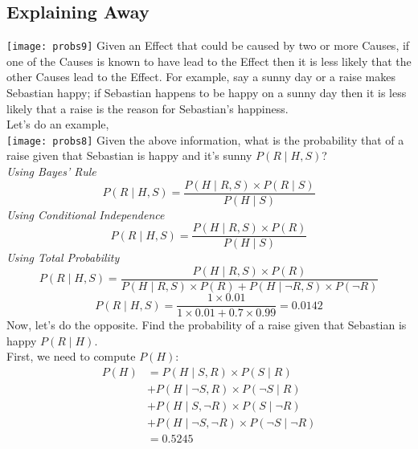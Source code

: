 \documentclass[12pt]{article}
\begin{document}
\subsection*{Explaining Away}
\vspace{2em}
\texttt{[image: probs9]}
Given an Effect that could be caused by two or more Causes, if one of the Causes is known to have lead to the Effect then it is less likely that the other Causes lead to the Effect. For example, say a \colorbox{myBlue}{sunny day} or a \colorbox{myBlue}{raise} makes Sebastian \colorbox{myRed}{happy}; if Sebastian happens to be \colorbox{myRed}{happy} on a  \colorbox{myBlue}{sunny day} then it is less likely that a \colorbox{myBlue}{raise} is the reason for Sebastian's happiness.\\
\vspace{2em}
Let's do an example,\\
\vspace{2em}
\texttt{[image: probs8]}
Given the above information, what is the probability that of a raise given that 
\vspace{2em}Sebastian is happy and it's sunny \(P(R\mid H, S)\)?\\
\textit{Using Bayes' Rule\\}
\begin{equation}
P(R\mid H, S) = \frac{P(H\mid R, S) \times P(R\mid S)}{P(H\mid S)}
\end{equation}
\textit{Using Conditional Independence\\}
\begin{equation}
P(R\mid H, S) = \frac{P(H\mid R, S) \times P(R)}{P(H\mid S)}
\end{equation}
\textit{Using Total Probability\\}
\begin{equation}
P(R\mid H, S) = \frac{P(H\mid R, S) \times P(R)}{P(H\mid R, S) \times P(R) + P(H\mid \neg R, S) \times P(\neg R)}
\end{equation}
\begin{equation}
P(R\mid H, S) = \frac{1 \times 0.01}{1 \times 0.01 + 0.7 \times 0.99} = 0.0142
\end{equation}
Now, let's do the opposite. Find the probability of a raise given that Sebastian is happy \(P(R \mid H)\).\\
First, we need to compute \(P(H)\):
\begin{align*}
P(H) & = P(H \mid S, R) \times P(S \mid R)\\
&+ P(H \mid \neg S, R) \times P(\neg S \mid R)\\
&+ P(H \mid S, \neg R) \times P(S \mid \neg R)\\
&+ P(H \mid \neg S, \neg R) \times P(\neg S \mid \neg R)\\
&= 0.5245
\end{align*}
\end{document}
